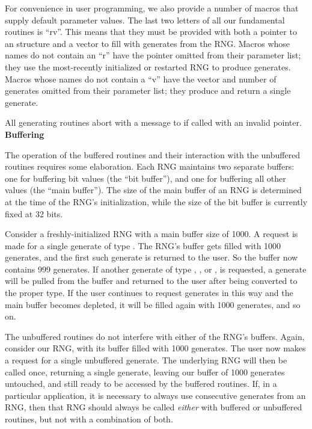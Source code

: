 For convenience in user programming, we also provide a number of macros
that supply default parameter values.  The last two letters of all our
fundamental routines is ``rv''.  This means that they must be provided
with both a pointer to an  structure and a vector to fill
with generates from the RNG.  Macros whose names do not contain an ``r''
have the  pointer omitted from their parameter list; they
use the most-recently initialized or restarted RNG to produce generates.
Macros whose names do not contain a ``v'' have the vector and number of
generates omitted from their parameter list; they produce and return a
single generate.

All generating routines abort with a message to  if called
with an invalid  pointer.\\

\noindent
{\bf Buffering\\}

The operation of the buffered routines and their interaction with the
unbuffered routines requires some elaboration.  Each RNG maintains two
separate buffers: one for buffering bit values (the ``bit buffer''), and
one for buffering all other values (the ``main buffer'').  The size of
the main buffer of an RNG is determined at the time of the RNG's
initialization, while the size of the bit buffer is currently fixed at
32 bits.

Consider a freshly-initialized RNG with a main buffer size of 1000.  A
request is made for a single generate of type .  The RNG's
buffer gets filled with 1000 generates, and the first such generate is
returned to the user.  So the buffer now contains 999 generates.  If
another generate of type , , or , is
requested, a generate will be pulled from the buffer and returned to the
user after being converted to the proper type.  If the user continues to
request generates in this way and the main buffer becomes depleted, it
will be filled again with 1000 generates, and so on.

The unbuffered routines do not interfere with either of the RNG's
buffers.  Again, consider our RNG, with its buffer filled with 1000
generates.  The user now makes a request for a single unbuffered
generate.  The underlying RNG will then be called once, returning a
single generate, leaving our buffer of 1000 generates untouched, and
still ready to be accessed by the buffered routines.  If, in a
particular application, it is necessary to always use consecutive
generates from an RNG, then that RNG should always be called {\em
either} with buffered or unbuffered routines, but not with a combination
of both.

